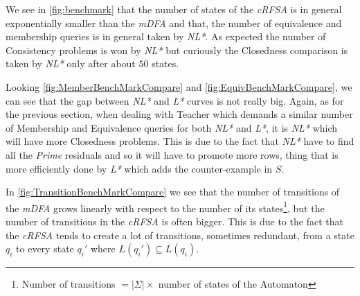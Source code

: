 We see in \cref{fig:benchmark} that the number of states of the \textit{cRFSA} is in general exponentially smaller than the \textit{mDFA} and that, the number of equivalence and membership queries is in general taken by \textit{NL*}. As expected the number of Consistency problems is won by \textit{NL*} but curiously the Closedness comparison is taken by \textit{NL*} only after about $50$ states.

Looking \cref{fig:MemberBenchMarkCompare} and \cref{fig:EquivBenchMarkCompare}, we can see that the gap between \textit{NL*} and \textit{L*} curves is not really big. Again, as for the previous section, when dealing with Teacher which demands a similar number of Membership and Equivalence queries for both \textit{NL*} and \textit{L*}, it is \textit{NL*} which will have more Closedness problems. This is due to the fact that \textit{NL*} have to find all the \textit{Prime} residuals and so it will have to promote more rows, thing that is more efficiently done by \textit{L*} which adds the counter-example in $S$.

In \cref{fig:TransitionBenchMarkCompare} we see that the number of transitions of the \textit{mDFA} grows linearly with respect to the number of its states\footnote{Number of transitions $= |\Sigma| \times$ number of states of the Automaton}, but the number of transitions in the \textit{cRFSA} is often bigger. This is due to the fact that the \textit{cRFSA} tends to create a lot of transitions, sometimes redundant, from a state $q_i$ to every state $q_i'$ where $L(q_i') \subseteq L(q_i)$.